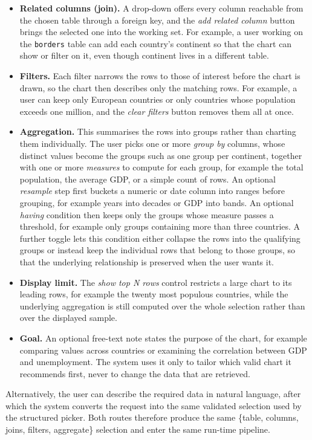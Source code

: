 \begin{itemize}
    \item \textbf{Related columns (join).} A drop-down offers every column reachable from the chosen table through a foreign key, and the \emph{add related column} button brings the selected one into the working set. For example, a user working on the \texttt{borders} table can add each country's continent so that the chart can show or filter on it, even though continent lives in a different table.
    \item \textbf{Filters.} Each filter narrows the rows to those of interest before the chart is drawn, so the chart then describes only the matching rows. For example, a user can keep only European countries or only countries whose population exceeds one million, and the \emph{clear filters} button removes them all at once.
    \item \textbf{Aggregation.} This summarises the rows into groups rather than charting them individually. The user picks one or more \emph{group by} columns, whose distinct values become the groups such as one group per continent, together with one or more \emph{measures} to compute for each group, for example the total population, the average GDP, or a simple count of rows. An optional \emph{resample} step first buckets a numeric or date column into ranges before grouping, for example years into decades or GDP into bands. An optional \emph{having} condition then keeps only the groups whose measure passes a threshold, for example only groups containing more than three countries. A further toggle lets this condition either collapse the rows into the qualifying groups or instead keep the individual rows that belong to those groups, so that the underlying relationship is preserved when the user wants it.
    \item \textbf{Display limit.} The \emph{show top N rows} control restricts a large chart to its leading rows, for example the twenty most populous countries, while the underlying aggregation is still computed over the whole selection rather than over the displayed sample.
    \item \textbf{Goal.} An optional free-text note states the purpose of the chart, for example comparing values across countries or examining the correlation between GDP and unemployment. The system uses it only to tailor which valid chart it recommends first, never to change the data that are retrieved.
\end{itemize}

Alternatively, the user can describe the required data in natural language, after which the system converts the request into the same validated selection used by the structured picker. Both routes therefore produce the same \{table, columns, joins, filters, aggregate\} selection and enter the same run-time pipeline.

